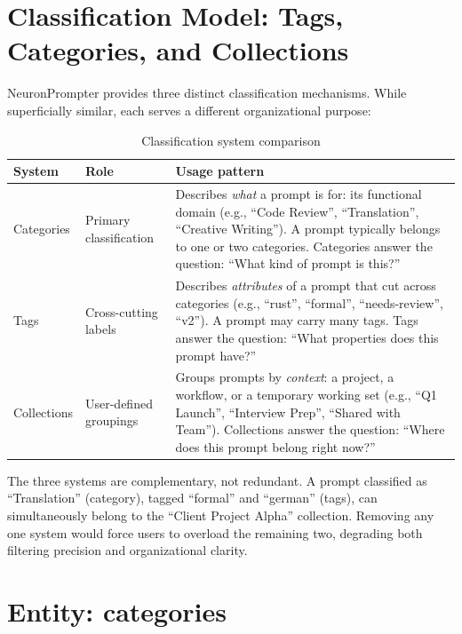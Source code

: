 \documentclass[a4paper, 11pt, oneside]{report}
\begin{document}
\section{Classification Model: Tags, Categories, and Collections}
\label{sec:classification-model}

NeuronPrompter provides three distinct classification mechanisms.  While
superficially similar, each serves a different organizational purpose:

\begin{table}[H]
  \centering
  \caption{Classification system comparison}
  \label{tab:classification}
  \begin{tabularx}{\textwidth}{l l X}
    \toprule
    \textbf{System} & \textbf{Role} & \textbf{Usage pattern} \\
    \midrule
    Categories & Primary classification &
      Describes \emph{what} a prompt is for: its functional domain
      (e.g., ``Code Review'', ``Translation'', ``Creative Writing'').
      A prompt typically belongs to one or two categories.  Categories
      answer the question: ``What kind of prompt is this?'' \\
    Tags       & Cross-cutting labels &
      Describes \emph{attributes} of a prompt that cut across categories
      (e.g., ``rust'', ``formal'', ``needs-review'', ``v2'').  A prompt
      may carry many tags.  Tags answer the question: ``What properties
      does this prompt have?'' \\
    Collections & User-defined groupings &
      Groups prompts by \emph{context}: a project, a workflow, or a
      temporary working set (e.g., ``Q1 Launch'', ``Interview Prep'',
      ``Shared with Team'').  Collections answer the question: ``Where
      does this prompt belong right now?'' \\
    \bottomrule
  \end{tabularx}
\end{table}

The three systems are complementary, not redundant.  A prompt classified
as ``Translation'' (category), tagged ``formal'' and ``german'' (tags),
can simultaneously belong to the ``Client Project Alpha'' collection.
Removing any one system would force users to overload the remaining two,
degrading both filtering precision and organizational clarity.

\section{Entity: categories}
\label{sec:entity-categories}
\end{document}

